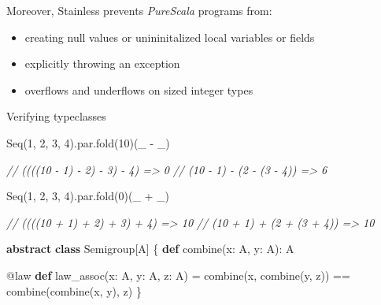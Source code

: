 \documentclass[
  ignorenonframetext,
]{beamer}
\newenvironment{Shaded}{}{}
\newcommand{\CommentTok}[1]{\textcolor[rgb]{0.38,0.63,0.69}{\textit{#1}}}
\newcommand{\DecValTok}[1]{\textcolor[rgb]{0.25,0.63,0.44}{#1}}
\newcommand{\FunctionTok}[1]{\textcolor[rgb]{0.02,0.16,0.49}{#1}}
\newcommand{\KeywordTok}[1]{\textcolor[rgb]{0.00,0.44,0.13}{\textbf{#1}}}
\newcommand{\NormalTok}[1]{#1}
\providecommand{\tightlist}{%
  \setlength{\itemsep}{0pt}\setlength{\parskip}{0pt}}
\begin{document}
\begin{frame}

Moreover, Stainless prevents \emph{PureScala} programs from:

\begin{itemize}
\tightlist
\item
  creating null values or unininitalized local variables or fields
\item
  explicitly throwing an exception
\item
  overflows and underflows on sized integer types
\end{itemize}

\end{frame}

\begin{frame}[fragile]{Verifying typeclasses}
\protect\hypertarget{verifying-typeclasses}{}

\begin{Shaded}
\begin{Highlighting}[]
\NormalTok{Seq(}\DecValTok{1}\NormalTok{, }\DecValTok{2}\NormalTok{, }\DecValTok{3}\NormalTok{, }\DecValTok{4}\NormalTok{).}\FunctionTok{par}\NormalTok{.}\FunctionTok{fold}\NormalTok{(}\DecValTok{10}\NormalTok{)(_ - _)}

\CommentTok{// ((((10 - 1) - 2) - 3) - 4) => 0}
\CommentTok{// (10 - 1) - (2 - (3 - 4))   => 6}
\end{Highlighting}
\end{Shaded}

\end{frame}

\begin{frame}[fragile]

\begin{Shaded}
\begin{Highlighting}[]
\NormalTok{Seq(}\DecValTok{1}\NormalTok{, }\DecValTok{2}\NormalTok{, }\DecValTok{3}\NormalTok{, }\DecValTok{4}\NormalTok{).}\FunctionTok{par}\NormalTok{.}\FunctionTok{fold}\NormalTok{(}\DecValTok{0}\NormalTok{)(_ + _)}

\CommentTok{// ((((10 + 1) + 2) + 3) + 4) => 10}
\CommentTok{// (10 + 1) + (2 + (3 + 4))   => 10}
\end{Highlighting}
\end{Shaded}

\end{frame}

\begin{frame}[fragile]

\begin{Shaded}
\begin{Highlighting}[]
\KeywordTok{abstract} \KeywordTok{class}\NormalTok{ Semigroup[A] \{}
  \KeywordTok{def} \FunctionTok{combine}\NormalTok{(x: A, y: A): A}
  
\NormalTok{  @law }\KeywordTok{def} \FunctionTok{law_assoc}\NormalTok{(x: A, y: A, z: A) =}
    \FunctionTok{combine}\NormalTok{(x, }\FunctionTok{combine}\NormalTok{(y, z)) == }\FunctionTok{combine}\NormalTok{(}\FunctionTok{combine}\NormalTok{(x, y), z)}
\NormalTok{\}}
\end{Highlighting}
\end{Shaded}

\end{frame}
\end{document}
